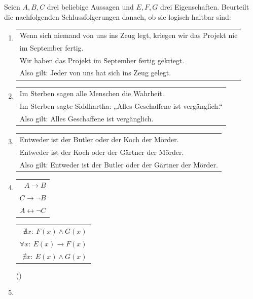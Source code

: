 \begin{aufg}
    Seien $A,B,C$ drei beliebige Aussagen und $E,F,G$ drei Eigenschaften. Beurteilt die nachfolgenden Schlussfolgerungen danach, ob sie logisch haltbar sind:
    \begin{enumerate}
        \item \begin{tabular}{l}
            Wenn sich niemand von uns ins Zeug legt, kriegen wir das Projekt nie \\
            \qquad im September fertig. \\
            Wir haben das Projekt im September fertig gekriegt. \\ \midrule
            Also gilt: Jeder von uns hat sich ins Zeug gelegt.
        \end{tabular}
        \item \begin{tabular}{l}
            Im Sterben sagen alle Menschen die Wahrheit. \\
            Im Sterben sagte Siddhartha: „Alles Geschaffene ist vergänglich.“ \\ \midrule
            Also gilt: Alles Geschaffene ist vergänglich.
        \end{tabular}
        \item \begin{tabular}{l}
            Entweder ist der Butler oder der Koch der Mörder. \\
            Entweder ist der Koch oder der Gärtner der Mörder. \\ \midrule
            Also gilt: Entweder ist der Butler oder der Gärtner der Mörder.
        \end{tabular}
        \item \begin{tabular}{r}
            $A\to B$ \\
            $C\to \neg B$ \\ \midrule
            $A\leftrightarrow \neg C$
        \end{tabular} \qquad\qquad\qquad {}\quad \begin{tabular}{r}
            $\nexists x:\ F(x)\land G(x)$ \\
            $\forall x:\ E(x)\to F(x)$ \\ \midrule
            $\nexists x:\ E(x)\land G(x)$
        \end{tabular} \qquad ()
        \item \begin{labeling}[font=\scshape]

\end{labeling}
\end{enumerate}
\end{aufg}
